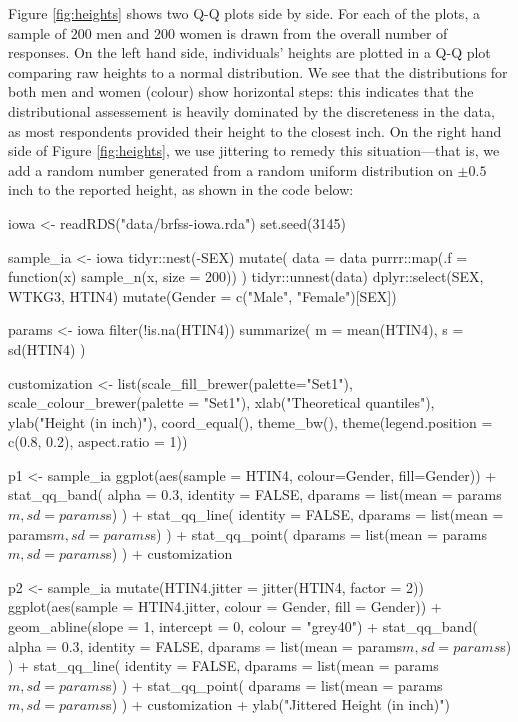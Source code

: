 Figure \ref{fig:heights} shows two Q-Q plots side by side. For each of
the plots, a sample of 200 men and 200 women is drawn from the overall
number of responses. On the left hand side, individuals' heights are
plotted in a Q-Q plot comparing raw heights to a normal distribution. We
see that the distributions for both men and women (colour) show
horizontal steps: this indicates that the distributional assessement is
heavily dominated by the discreteness in the data, as most respondents
provided their height to the closest inch. On the right hand side of
Figure \ref{fig:heights}, we use jittering to remedy this
situation---that is, we add a random number generated from a random
uniform distribution on \(\pm 0.5\) inch to the reported height, as
shown in the code below:

\begin{Schunk}
\begin{Sinput}
iowa <- readRDS("data/brfss-iowa.rda")
set.seed(3145)

sample_ia <- iowa %>% 
  tidyr::nest(-SEX) %>% 
  mutate(
    data = data %>% 
    purrr::map(.f = function(x) sample_n(x, size = 200))
    ) %>% 
  tidyr::unnest(data) %>% 
  dplyr::select(SEX, WTKG3, HTIN4) %>%
  mutate(Gender = c("Male", "Female")[SEX])

params <- iowa %>% 
  filter(!is.na(HTIN4)) %>% 
  summarize(
    m = mean(HTIN4),
    s = sd(HTIN4)
  )

customization <- list(scale_fill_brewer(palette="Set1"),
  scale_colour_brewer(palette = "Set1"),
  xlab("Theoretical quantiles"),
  ylab("Height (in inch)"),
  coord_equal(),
  theme_bw(),
  theme(legend.position = c(0.8, 0.2), aspect.ratio = 1))

p1 <- sample_ia %>% 
  ggplot(aes(sample = HTIN4, colour=Gender, fill=Gender)) + 
  stat_qq_band(
    alpha = 0.3, 
    identity = FALSE,
    dparams = list(mean = params$m, sd = params$s)
  ) + 
  stat_qq_line( 
    identity = FALSE,
    dparams = list(mean = params$m, sd = params$s)
  ) + 
  stat_qq_point( 
    dparams = list(mean = params$m, sd = params$s)
  ) +
  customization

p2 <- sample_ia %>% 
  mutate(HTIN4.jitter = jitter(HTIN4, factor = 2)) %>% 
  ggplot(aes(sample = HTIN4.jitter, colour = Gender, fill = Gender)) + 
  geom_abline(slope = 1, intercept = 0, colour = "grey40") +
  stat_qq_band(
    alpha = 0.3, 
    identity = FALSE,
    dparams = list(mean = params$m, sd = params$s)
  ) +
  stat_qq_line(
    identity = FALSE,
    dparams = list(mean = params$m, sd = params$s)
  ) + 
  stat_qq_point(
    dparams = list(mean = params$m, sd = params$s)
  ) +
  customization +
  ylab("Jittered Height (in inch)") 
\end{Sinput}
\end{Schunk}

